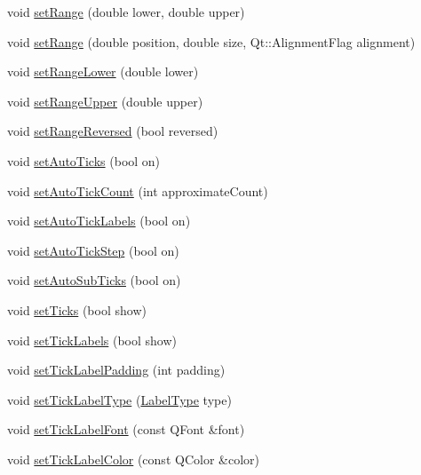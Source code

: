 \begin{DoxyCompactItemize}
void \mbox{\hyperlink{class_q_c_p_axis_a57d6ee9e9009fe88cb19db476ec70bca}{set\+Range}} (double lower, double upper)
\item 
void \mbox{\hyperlink{class_q_c_p_axis_acf60e5b2d631fbc8c4548c3d579cb6d0}{set\+Range}} (double position, double size, Qt\+::\+Alignment\+Flag alignment)
\item 
void \mbox{\hyperlink{class_q_c_p_axis_afcf51227d337db28d1a9ce9a4d1bc91a}{set\+Range\+Lower}} (double lower)
\item 
void \mbox{\hyperlink{class_q_c_p_axis_acd3ca1247aa867b540cd5ec30ccd3bef}{set\+Range\+Upper}} (double upper)
\item 
void \mbox{\hyperlink{class_q_c_p_axis_a2172fdb196b1a0dc3f40992fcad8e9e1}{set\+Range\+Reversed}} (bool reversed)
\item 
void \mbox{\hyperlink{class_q_c_p_axis_ae867c23d3a6a7bd4d09cc66c5d018f63}{set\+Auto\+Ticks}} (bool on)
\item 
void \mbox{\hyperlink{class_q_c_p_axis_a7c7111cbeac9ec5fcb40f93a1ef51a0b}{set\+Auto\+Tick\+Count}} (int approximate\+Count)
\item 
void \mbox{\hyperlink{class_q_c_p_axis_aaa47e3a6bac0c20d4beb9028f01bc1a1}{set\+Auto\+Tick\+Labels}} (bool on)
\item 
void \mbox{\hyperlink{class_q_c_p_axis_a99fe77b034e06f5b723995beab96e741}{set\+Auto\+Tick\+Step}} (bool on)
\item 
void \mbox{\hyperlink{class_q_c_p_axis_adcbdec7a60054b88571e89599f4a45bf}{set\+Auto\+Sub\+Ticks}} (bool on)
\item 
void \mbox{\hyperlink{class_q_c_p_axis_ac891409315bc379e3b1abdb162c1a011}{set\+Ticks}} (bool show)
\item 
void \mbox{\hyperlink{class_q_c_p_axis_a04ba16e1f6f78d70f938519576ed32c8}{set\+Tick\+Labels}} (bool show)
\item 
void \mbox{\hyperlink{class_q_c_p_axis_af302c479af9dbc2e9f0e44e07c0012ee}{set\+Tick\+Label\+Padding}} (int padding)
\item 
void \mbox{\hyperlink{class_q_c_p_axis_a54f24f5ce8feea25209388a863d7e448}{set\+Tick\+Label\+Type}} (\mbox{\hyperlink{class_q_c_p_axis_a4a7da0166f755f5abac23b765d184cad}{Label\+Type}} type)
\item 
void \mbox{\hyperlink{class_q_c_p_axis_a2b8690c4e8dbc39d9185d2b398ce7a6c}{set\+Tick\+Label\+Font}} (const Q\+Font \&font)
\item 
void \mbox{\hyperlink{class_q_c_p_axis_a395e445c3fe496b935bee7b911ecfd1c}{set\+Tick\+Label\+Color}} (const Q\+Color \&color)

\end{DoxyCompactItemize}
